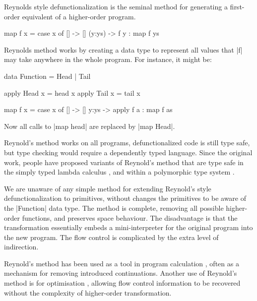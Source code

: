 \documentclass[preprint]{sigplanconf}
\begin{document}
Reynolds style defunctionalization \cite{reynolds:defunc} is the seminal method for generating a first-order equivalent of a higher-order program.

\begin{example}
\begin{code}
map f x = case  x of
                []      -> []
                (y:ys)  -> f y : map f ys
\end{code}

\noindent Reynolds method works by creating a data type to represent all values that |f| may take anywhere in the whole program. For instance, it might be:

\begin{code}
data Function = Head | Tail

apply Head  x = head  x
apply Tail  x = tail  x

map f x = case  x of
                []    -> []
                y:ys  -> apply f a : map f as
\end{code}

\noindent Now all calls to |map head| are replaced by |map Head|.
\end{example}

Reynold's method works on all programs, defunctionalized code is still type safe, but type checking would require a dependently typed language. Since the original work, people have proposed variants of Reynold's method that are type safe in the simply typed lambda calculus \cite{bell:type_driven_defunctionalization}, and within a polymorphic type system \cite{pottier:polymorhpic_typed_defunctionaization}.

We are unaware of any simple method for extending Reynold's style defunctionalization to primitives, without changes the primitives to be aware of the |Function| data type. The method is complete, removing all possible higher-order functions, and preserves space behaviour. The disadvantage is that the transformation essentially embeds a mini-interpreter for the original program into the new program. The flow control is complicated by the extra level of indirection.

Reynold's method has been used as a tool in program calculation \cite{danvy:defunctionalization_at_work,hutton:calculating_an_exceptional_machine}, often as a mechanism for removing introduced continuations. Another use of Reynold's method is for optimisation \cite{grin,jhc}, allowing flow control information to be recovered without the complexity of higher-order transformation.
\end{document}
